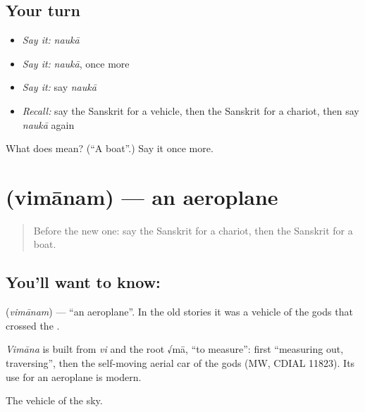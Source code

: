 \subsection*{Your turn}
\begin{itemize}
\raggedright
  \item \emph{Say it:} \emph{naukā}
  \item \emph{Say it:} \emph{naukā}, once more
  \item \emph{Say it:} say \emph{naukā}
  \item \emph{Recall:} say the Sanskrit for a vehicle, then the Sanskrit for a chariot, then say \emph{naukā} again
\end{itemize}

\begin{tcolorbox}[breakable,colback=teal!4,colframe=teal!35!black,title={Before you move on}]
What does  mean? (\textquotedblleft{}A boat\textquotedblright{}.) Say it once more.
\end{tcolorbox}
\section[\texorpdfstring{\sk{विमानम्} (vimānam)}{विमानम् (vimānam)}]{ (vimānam) — an aeroplane}

\label{lesson:SA-C75-plane}



\begin{quote}
Before the new one: say the Sanskrit for a chariot, then the Sanskrit for a boat.
\end{quote}

\subsection*{You'll want to know: }
\textbf{} (\emph{vimānam}) — \textquotedblleft{}an aeroplane\textquotedblright{}. In the old stories it was a vehicle of the gods that crossed the \textbf{}.

\begin{cousinweb}
\emph{Vimāna} is built from \emph{vi} and the root √mā, \textquotedblleft{}to measure\textquotedblright{}: first \textquotedblleft{}measuring out, traversing\textquotedblright{}, then the self-moving aerial car of the gods (MW, CDIAL 11823). Its use for an aeroplane is modern.
\end{cousinweb}

\begin{grammarlens}[title={What you've built}]
The vehicle of the sky.
\end{grammarlens}


